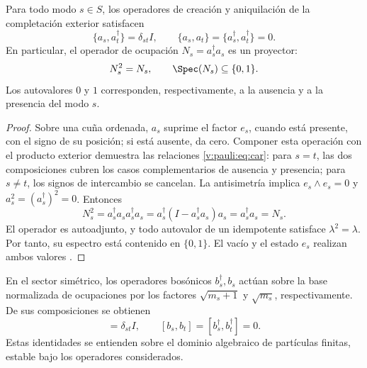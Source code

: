 \begin{theorem}
\label{v:rec:completaciones:statement:01}
\label{v:rec:thm:principio-exclusion-pauli}
Para todo modo \(s\in S\), los operadores de creación y aniquilación de la
completación exterior satisfacen
\begin{equation}
 \{a_s,a_t^\dagger\}=\delta_{st}I,
 \qquad
 \{a_s,a_t\}=\{a_s^\dagger,a_t^\dagger\}=0.
 \label{v:pauli:eq:car}
\end{equation}
En particular, el operador de ocupación
\(N_s=a_s^\dagger a_s\) es un proyector:
\begin{equation}
 N_s^2=N_s,
 \qquad \Spec(N_s)\subseteq\{0,1\}.
 \label{v:pauli:eq:proyeccion-ocupacion}
\end{equation}
Los autovalores \(0\) y \(1\) corresponden, respectivamente, a la ausencia
y a la presencia del modo \(s\).
\end{theorem}

\begin{proof}
Sobre una cuña ordenada, \(a_s\) suprime el factor \(e_s\), cuando está
presente, con el signo de su posición; si está ausente, da cero. Componer
esta operación con el producto exterior demuestra las relaciones
\eqref{v:pauli:eq:car}: para \(s=t\), las dos composiciones cubren los casos
complementarios de ausencia y presencia; para \(s\ne t\), los signos de
intercambio se cancelan. La antisimetría implica
\(e_s\wedge e_s=0\) y
\(a_s^2=(a_s^\dagger)^2=0\). Entonces
\begin{equation}
 N_s^2=a_s^\dagger a_s a_s^\dagger a_s
 =a_s^\dagger(I-a_s^\dagger a_s)a_s
 =a_s^\dagger a_s=N_s.
 \label{v:pauli:eq:prueba-idempotencia}
\end{equation}
El operador es autoadjunto, y todo autovalor de un idempotente satisface
\(\lambda^2=\lambda\). Por tanto, su espectro está contenido en
\(\{0,1\}\). El vacío y el estado \(e_s\) realizan ambos valores
\cite{Pauli1925,Dirac1926}.
\end{proof}

En el sector simétrico, los operadores bosónicos \(b_s^\dagger,b_s\)
actúan sobre la base normalizada de ocupaciones por los factores
\(\sqrt{m_s+1}\) y \(\sqrt{m_s}\), respectivamente. De sus composiciones
se obtienen
\begin{equation}
 [b_s,b_t^\dagger]=\delta_{st}I,
 \qquad [b_s,b_t]=[b_s^\dagger,b_t^\dagger]=0.
 \label{v:pauli:eq:ccr}
\end{equation}
Estas identidades se entienden sobre el dominio algebraico de partículas
finitas, estable bajo los operadores considerados.

